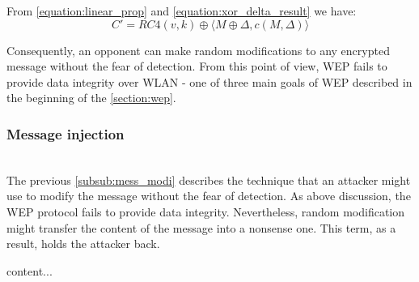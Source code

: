 From \autoref{equation:linear_prop} and \autoref{equation:xor_delta_result} we have:
\begin{equation}
	C' = RC4(v,k) \oplus \langle M\oplus\Delta, c(M, \Delta)\rangle
\end{equation}

Consequently, an opponent can make random modifications to any encrypted message without the fear of detection. From this point of view, \ac{WEP} fails to provide data integrity over \ac{WLAN} - one of three main goals of \ac{WEP} described in the beginning of the \autoref{section:wep}.

\subsubsection{Message injection}~\\
The previous \autoref{subsub:mess_modi} describes the technique that an attacker might use to modify the message without the fear of detection. As above discussion, the \ac{WEP} protocol fails to provide data integrity. Nevertheless, random modification might transfer the content of the message into a nonsense one. This term, as a result, holds the attacker back.

\begin{property}
	content...
\end{property}
